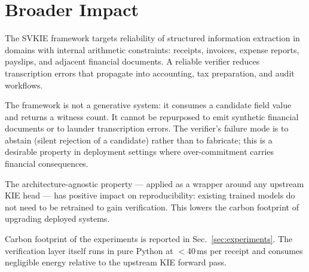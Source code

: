 \section{Broader Impact}
\label{sec:broader_impact}

The SVKIE framework targets reliability of structured information
extraction in domains with internal arithmetic constraints: receipts,
invoices, expense reports, payslips, and adjacent financial documents.
A reliable verifier reduces transcription errors that propagate into
accounting, tax preparation, and audit workflows.

The framework is not a generative system: it consumes a candidate
field value and returns a witness count.  It cannot be repurposed to
emit synthetic financial documents or to launder transcription
errors.  The verifier's failure mode is to abstain (silent rejection
of a candidate) rather than to fabricate; this is a desirable
property in deployment settings where over-commitment carries
financial consequences.

The architecture-agnostic property — applied as a wrapper around any
upstream KIE head — has positive impact on reproducibility: existing
trained models do not need to be retrained to gain verification.
This lowers the carbon footprint of upgrading deployed systems.

Carbon footprint of the experiments is reported in
Sec.~\ref{sec:experiments}.  The verification layer itself runs in
pure Python at $<$40\,ms per receipt and consumes negligible energy
relative to the upstream KIE forward pass.
